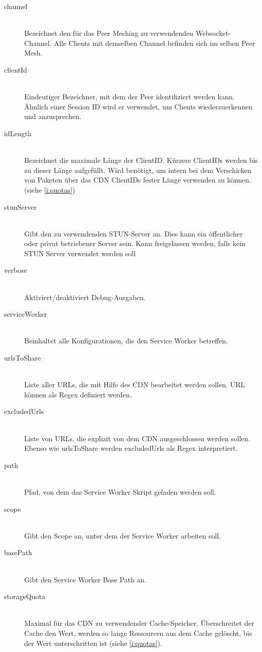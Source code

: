 \begin{description}
\item[channel]\hfill \\
Bezeichnet den für das Peer Meshing zu verwendenden Websocket-Channel. Alle Clients mit demselben Channel befinden sich im selben Peer Mesh.
\item[clientId]\hfill \\
Eindeutiger Bezeichner, mit dem der Peer identifiziert werden kann. Ähnlich einer Session ID wird er verwendet, um Clients wiederzuerkennen und anzusprechen.
\item[idLength]\hfill \\
Bezeichnet die maximale Länge der ClientID. Kürzere ClientIDs werden bis zu dieser Länge aufgefüllt. Wird benötigt, um intern bei dem Verschicken von Paketen über das CDN ClientIDs fester Länge verwenden zu können.(siehe \ref{i:quotas}) 
\item[stunServer]\hfill \\
Gibt den zu verwendenden STUN-Server an. Dies kann ein öffentlicher oder privat betriebener Server sein. Kann freigelassen werden, falls kein STUN Server verwendet werden soll
\item[verbose]\hfill \\
Aktiviert/deaktiviert Debug-Ausgaben.
\item[serviceWorker]\hfill \\
Beinhaltet alle Konfigurationen, die den Service Worker betreffen.
\item[urlsToShare]\hfill \\
Liste aller URLs, die mit Hilfe des CDN bearbeitet werden sollen. URL können als Regex definiert werden.
\item[excludedUrls]\hfill \\
Liste von URLs, die explizit von dem CDN ausgeschlossen werden sollen. Ebenso wie urlsToShare werden excludedUrls als Regex interpretiert.
\item[path]\hfill \\
Pfad, von dem das Service Worker Skript geladen werden soll.
\item[scope]\hfill \\
Gibt den Scope an, unter dem der Service Worker arbeiten soll. 
\item[basePath]\hfill \\
Gibt den Service Worker Base Path an.
\item[storageQuota]\hfill \\
Maximal für das CDN zu verwendender Cache-Speicher. Überschreitet der Cache den Wert, werden so lange Ressourcen aus dem Cache gelöscht, bis der Wert unterschritten ist (siehe \ref{i:quotas}). 

\end{description}
